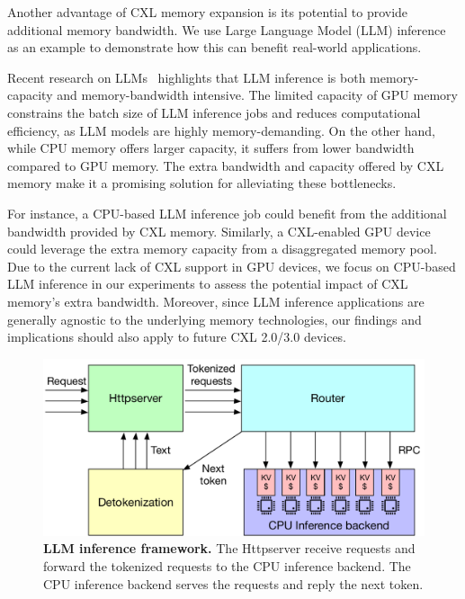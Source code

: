 Another advantage of CXL memory expansion is its potential to provide additional memory bandwidth. We use Large Language Model (LLM) inference as an example to demonstrate how this can benefit real-world applications.

Recent research on LLMs~\cite{gpt4} highlights that LLM inference is both memory-capacity and memory-bandwidth intensive. The limited capacity of GPU memory constrains the batch size of LLM inference jobs and reduces computational efficiency, as LLM models are highly memory-demanding. On the other hand, while CPU memory offers larger capacity, it suffers from lower bandwidth compared to GPU memory. The extra bandwidth and capacity offered by CXL memory make it a promising solution for alleviating these bottlenecks.

For instance, a CPU-based LLM inference job could benefit from the additional bandwidth provided by CXL memory. Similarly, a CXL-enabled GPU device could leverage the extra memory capacity from a disaggregated memory pool. Due to the current lack of CXL support in GPU devices, we focus on CPU-based LLM inference in our experiments to assess the potential impact of CXL memory’s extra bandwidth. Moreover, since LLM inference applications are generally agnostic to the underlying memory technologies, our findings and implications should also apply to future CXL 2.0/3.0 devices.


\begin{figure}[t]
\centering
 \includegraphics[width=0.6\columnwidth]{fig/cxl/llm.pdf}
  \caption[LLM inference framework]{\textbf{LLM inference framework.} The Httpserver receive requests and forward the tokenized requests to the CPU inference backend. The CPU inference backend serves the requests and reply the next token.}
\label{fig:llm-framework}
\end{figure}

